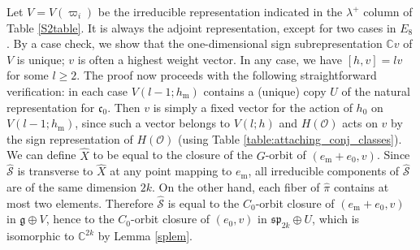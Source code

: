 \documentclass{amsart}
\theoremstyle{definition}
\DeclareMathOperator{\GL}{GL}
\DeclareMathOperator{\Sp}{Sp}
\DeclareMathOperator{\SO}{SO}
\newcommand{\C}{\mathbb{C}}
\newcommand{\Z}{\mathbb{Z}}
\newcommand{\m}{\mathrm{m}}
\newcommand{\g}{\mathfrak{g}}
\newcommand{\cg}{\mathfrak{c}}
\newcommand{\0}{\mathcal{O}}
\begin{document}

Let $V=V(\varpi_i)$ be the irreducible representation indicated in 
the $\lambda^+$ column of 
Table \ref{S2table}.  It is always the adjoint representation,
except for two cases in $E_8$.
By a case check, we show that the one-dimensional sign subrepresentation $\C v$ of $V$ is unique; $v$ is often a highest weight vector.
In any case, we have $[h,v]=l v$ for some $l\geq 2$.
The proof now proceeds with the following straightforward verification: in each case $V(l-1;h_\m)$ contains a (unique) copy $U$ of the natural representation for $\cg_0$.
Then $v$ is simply a fixed vector for the action of $h_0$ on $V(l-1;h_\m)$, since such a vector belongs to $V(l;h)$ and 
$H(\0)$ acts on $v$ by the sign representation of $H(\0)$ (using Table \ref{table:attaching_conj_classes}).
We can define $\hat{X}$ to be equal to the closure of the $G$-orbit of $(e_\m+e_0,v)$.
Since $\hat{\mathcal S}$ is transverse to $\hat{X}$ at any point mapping to $e_\m$, all irreducible components of $\hat{\mathcal S}$ are of the same dimension $2k$.
On the other hand, each fiber of $\hat\pi$ contains at most two elements.
Therefore $\hat{\mathcal S}$ is equal to the $C_0$-orbit closure of $(e_\m+e_0,v)$ in $\g\oplus V$, hence to the $C_0$-orbit closure of $(e_0,v)$ in $\mathfrak{sp}_{2k}\oplus U$, which is isomorphic to $\C^{2k}$ by Lemma \ref{splem}.
\end{document}
